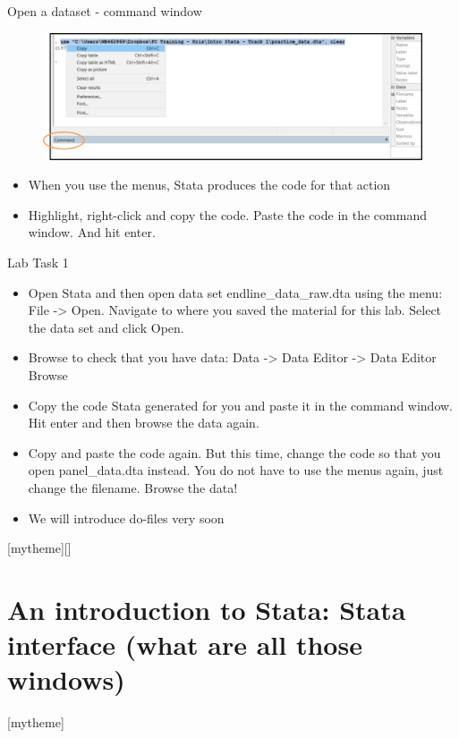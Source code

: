 \documentclass[aspectratio=169]{beamer}
\newcommand{\sectionpic}[2]{
	\setbeamertemplate{section page}[mytheme][#2]
	\section{#1}
	\setbeamertemplate{section page}[mytheme]
}
\begin{document}
\begin{frame}[fragile]{Open a dataset - command window}
	\begin{figure}
		\centering
		\includegraphics[width=\linewidth]{img/open_data_command}
	\end{figure}
\begin{itemize}
	\item When you use the menus, Stata produces the code for that action
	\item Highlight, right-click and copy the code. Paste the code in the command window. And hit enter.
\end{itemize}
\end{frame}

\begin{frame}{Lab Task 1}
\begin{itemize}
	\item Open Stata and then open data set endline\_data\_raw.dta using the menu: File -> Open. \newline Navigate to where you saved the material for this lab. Select the data set and click Open.
	\item Browse to check that you have data: Data -> Data Editor -> Data Editor Browse 
	\item Copy the code Stata generated for you and paste it in the command window. Hit enter and then browse the data again.
	\item Copy and paste the code again. But this time, change the code so that you open panel\_data.dta instead. You do not have to use the menus again, just change the filename. Browse the data!
	\item We will introduce do-files very soon
\end{itemize}
\end{frame}


\sectionpic{An introduction to Stata: Stata interface (what are all those windows)}{}
\end{document}
